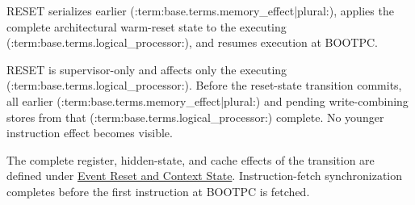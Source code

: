 RESET serializes earlier (:term:base.terms.memory_effect|plural:), applies the complete architectural warm-reset state to the executing (:term:base.terms.logical_processor:), and resumes execution at BOOTPC.

RESET is supervisor-only and affects only the executing (:term:base.terms.logical_processor:). Before the reset-state transition commits,
all earlier (:term:base.terms.memory_effect|plural:) and pending write-combining stores from that (:term:base.terms.logical_processor:) complete. No younger
instruction effect becomes visible.

The complete register, hidden-state, and cache effects of the transition are defined under
\hyperref[section:event-reset-and-context-state]{Event Reset and Context State}. Instruction-fetch synchronization
completes before the first instruction at BOOTPC is fetched.
